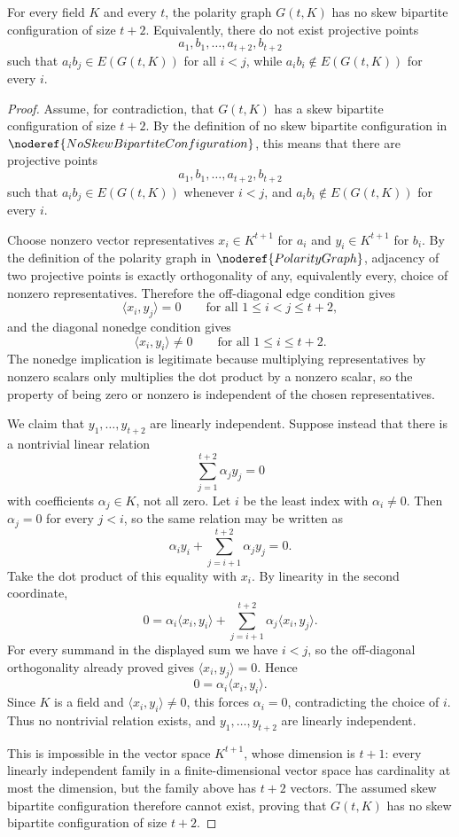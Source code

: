 \begin{lemma}
For every field \(K\) and every \(t\), the polarity graph \(G(t,K)\) has no skew bipartite configuration of size \(t+2\). Equivalently, there do not exist projective points
\[
  a_1,b_1,\ldots,a_{t+2},b_{t+2}
\]
such that \(a_i b_j\in E(G(t,K))\) for all \(i<j\), while \(a_i b_i\notin E(G(t,K))\) for every \(i\).
\end{lemma}
\begin{proof}
Assume, for contradiction, that \(G(t,K)\) has a skew bipartite configuration of size \(t+2\). By the definition of no skew bipartite configuration in \(\noderef{NoSkewBipartiteConfiguration}\), this means that there are projective points
\[
  a_1,b_1,\ldots,a_{t+2},b_{t+2}
\]
such that \(a_i b_j\in E(G(t,K))\) whenever \(i<j\), and \(a_i b_i\notin E(G(t,K))\) for every \(i\).

Choose nonzero vector representatives \(x_i\in K^{t+1}\) for \(a_i\) and \(y_i\in K^{t+1}\) for \(b_i\). By the definition of the polarity graph in \(\noderef{PolarityGraph}\), adjacency of two projective points is exactly orthogonality of any, equivalently every, choice of nonzero representatives. Therefore the off-diagonal edge condition gives
\[
  \langle x_i,y_j\rangle=0 \qquad\text{for all } 1\le i<j\le t+2,
\]
and the diagonal nonedge condition gives
\[
  \langle x_i,y_i\rangle\ne 0 \qquad\text{for all } 1\le i\le t+2.
\]
The nonedge implication is legitimate because multiplying representatives by nonzero scalars only multiplies the dot product by a nonzero scalar, so the property of being zero or nonzero is independent of the chosen representatives.

We claim that \(y_1,\ldots,y_{t+2}\) are linearly independent. Suppose instead that there is a nontrivial linear relation
\[
  \sum_{j=1}^{t+2}\alpha_j y_j=0
\]
with coefficients \(\alpha_j\in K\), not all zero. Let \(i\) be the least index with \(\alpha_i\ne 0\). Then \(\alpha_j=0\) for every \(j<i\), so the same relation may be written as
\[
  \alpha_i y_i+\sum_{j=i+1}^{t+2}\alpha_j y_j=0.
\]
Take the dot product of this equality with \(x_i\). By linearity in the second coordinate,
\[
  0=\alpha_i\langle x_i,y_i\rangle+\sum_{j=i+1}^{t+2}\alpha_j\langle x_i,y_j\rangle.
\]
For every summand in the displayed sum we have \(i<j\), so the off-diagonal orthogonality already proved gives \(\langle x_i,y_j\rangle=0\). Hence
\[
  0=\alpha_i\langle x_i,y_i\rangle.
\]
Since \(K\) is a field and \(\langle x_i,y_i\rangle\ne 0\), this forces \(\alpha_i=0\), contradicting the choice of \(i\). Thus no nontrivial relation exists, and \(y_1,\ldots,y_{t+2}\) are linearly independent.

This is impossible in the vector space \(K^{t+1}\), whose dimension is \(t+1\): every linearly independent family in a finite-dimensional vector space has cardinality at most the dimension, but the family above has \(t+2\) vectors. The assumed skew bipartite configuration therefore cannot exist, proving that \(G(t,K)\) has no skew bipartite configuration of size \(t+2\).
\end{proof}
